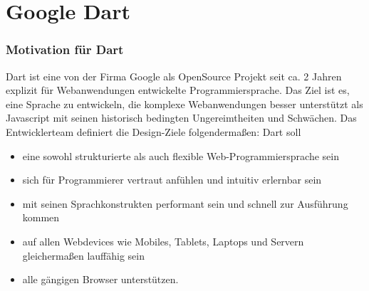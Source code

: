 \section{Google Dart}\label{s.Google Dart }

\subsubsection{Motivation für Dart}
Dart ist eine von der Firma Google als OpenSource Projekt seit ca. 2 Jahren explizit für Webanwendungen entwickelte Programmiersprache. Das Ziel ist es, eine Sprache zu entwickeln, die komplexe Webanwendungen besser unterstützt als Javascript mit seinen historisch bedingten Ungereimtheiten und Schwächen.
Das Entwicklerteam definiert die Design-Ziele folgendermaßen:
Dart soll
\begin{itemize}   
\item eine sowohl strukturierte als auch flexible Web-Programmiersprache sein
\item sich für Programmierer vertraut anfühlen und intuitiv erlernbar sein 
\item mit seinen Sprachkonstrukten performant sein und schnell zur Ausführung kommen
\item auf allen Webdevices wie Mobiles, Tablets, Laptops und Servern gleichermaßen lauffähig sein
\item alle gängigen Browser unterstützen.
\end{itemize}

